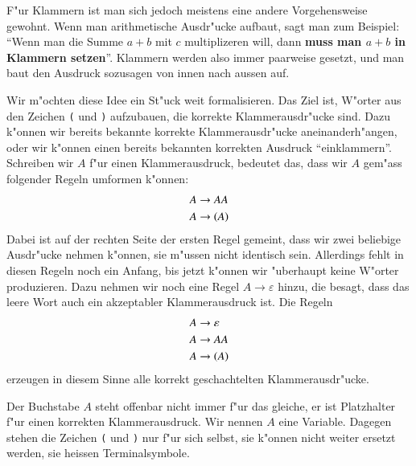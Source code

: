 F"ur Klammern ist man sich jedoch meistens eine andere Vorgehensweise
gewohnt. Wenn man arithmetische Ausdr"ucke aufbaut, sagt man zum
Beispiel: ``Wenn man die Summe $a+b$ mit $c$ multiplizeren will,
dann {\bf muss man $a+b$ in Klammern setzen}''.
Klammern werden also immer paarweise gesetzt, und man baut den
Ausdruck sozusagen von innen nach aussen auf.

Wir m"ochten diese Idee ein St"uck weit formalisieren. Das Ziel ist,
W"orter aus den Zeichen {\tt (} und {\tt )} aufzubauen, die korrekte
Klammerausdr"ucke sind. Dazu k"onnen wir bereits bekannte korrekte
Klammerausdr"ucke aneinanderh"angen, oder wir k"onnen einen bereits
bekannten korrekten Ausdruck ``einklammern''. Schreiben wir $A$
f"ur einen Klammerausdruck, bedeutet das, dass wir $A$ gem"ass
folgender Regeln umformen k"onnen:
\begin{align*}
A&\to AA\\
A&\to {\tt (}A{\tt )}
\end{align*}
Dabei ist auf der rechten Seite der ersten Regel gemeint, dass wir zwei beliebige
Ausdr"ucke nehmen k"onnen, sie m"ussen nicht identisch sein. Allerdings
fehlt in diesen Regeln noch ein Anfang, bis jetzt k"onnen wir "uberhaupt
keine W"orter produzieren. Dazu nehmen wir noch eine Regel $A\to\varepsilon$
hinzu, die besagt, dass das leere Wort auch ein akzeptabler
Klammerausdruck ist. Die Regeln
\begin{equation}
\begin{aligned}
A&\to\varepsilon\\
A&\to AA\\
A&\to {\tt (}A{\tt )}
\end{aligned}
\label{regeln-beispiel}
\end{equation}
erzeugen in diesem Sinne alle korrekt geschachtelten Klammerausdr"ucke.

Der Buchstabe $A$ steht offenbar nicht immer f"ur das gleiche, 
er ist Platzhalter f"ur einen korrekten Klammerausdruck. Wir nennen
$A$ eine Variable.
Dagegen stehen die Zeichen {\tt (} und {\tt )} nur f"ur sich selbst, sie
k"onnen nicht weiter ersetzt werden, sie heissen Terminalsymbole.

